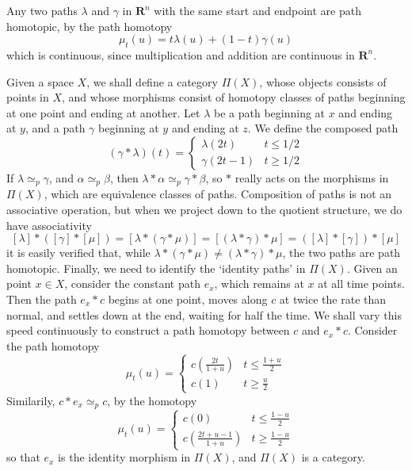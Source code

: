 \begin{example}
    Any two paths $\lambda$ and $\gamma$ in $\mathbf{R}^n$ with the same start and endpoint are path homotopic, by the path homotopy
    \[ \mu_t(u) = t \lambda(u) + (1 - t) \gamma(u) \]
    which is continuous, since multiplication and addition are continuous in $\mathbf{R}^n$.
\end{example}

Given a space $X$, we shall define a category $\Pi(X)$, whose objects consists of points in $X$, and whose morphisms consist of homotopy classes of paths beginning at one point and ending at another. Let $\lambda$ be a path beginning at $x$ and ending at $y$, and a path $\gamma$ beginning at $y$ and ending at $z$. We define the composed path
%
\[ (\gamma * \lambda)(t) = \begin{cases} \lambda(2t) & t \leq 1/2 \\ \gamma(2t - 1) & t \geq 1/2 \end{cases} \]
%
If $\lambda \simeq_p \gamma$, and $\alpha \simeq_p \beta$, then $\lambda * \alpha \simeq_p \gamma * \beta$, so $*$ really acts on the morphisms in $\Pi(X)$, which are equivalence classes of paths. Composition of paths is not an associative operation, but when we project down to the quotient structure, we do have associativity
%
\[ [\lambda] * ([\gamma] * [\mu]) = [\lambda * (\gamma * \mu)] = [(\lambda * \gamma) * \mu] = ([\lambda] * [\gamma]) * [\mu] \]
%
it is easily verified that, while $\lambda * (\gamma * \mu) \neq (\lambda * \gamma) * \mu$, the two paths are path homotopic. Finally, we need to identify the `identity paths' in $\Pi(X)$. Given an point $x \in X$, consider the constant path $e_x$, which remains at $x$ at all time points. Then the path $e_x * c$ begins at one point, moves along $c$ at twice the rate than normal, and settles down at the end, waiting for half the time. We shall vary this speed continuously to construct a path homotopy between $c$ and $e_x * c$. Consider the path homotopy
%
\[ \mu_t(u) = \begin{cases} c(\frac{2t}{1+u}) & t \leq \frac{1 + u}{2} \\ c(1) & t \geq \frac{u}{2} \end{cases} \]
%
Similarily, $c * e_x \simeq_p c$, by the homotopy
%
\[ \mu_t(u) = \begin{cases} c(0) & t \leq \frac{1 - u}{2} \\ c(\frac{2t + u - 1}{1+u}) & t \geq \frac{1 - u}{2} \end{cases} \]
%
so that $e_x$ is the identity morphism in $\Pi(X)$, and $\Pi(X)$ is a category.

